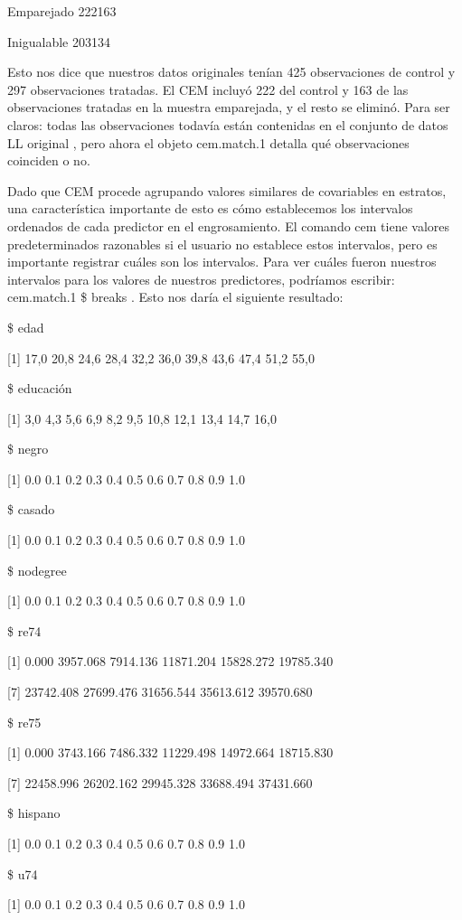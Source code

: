 \documentclass[
]{book}
\begin{document}
Emparejado 222163

Inigualable 203134

Esto nos dice que nuestros datos originales tenían 425 observaciones de control y 297 observaciones tratadas. El CEM incluyó 222 del control y 163 de las observaciones tratadas en la muestra emparejada, y el resto se eliminó. Para ser claros: todas las observaciones todavía están contenidas en el conjunto de datos LL original , pero ahora el objeto cem.match.1 detalla qué observaciones coinciden o no.

Dado que CEM procede agrupando valores similares de covariables en estratos, una característica importante de esto es cómo establecemos los intervalos ordenados de cada predictor en el engrosamiento. El comando cem tiene valores predeterminados razonables si el usuario no establece estos intervalos, pero es importante registrar cuáles son los intervalos. Para ver cuáles fueron nuestros intervalos para los valores de nuestros predictores, podríamos escribir: cem.match.1 \$ breaks . Esto nos daría el siguiente resultado:

\$ edad

{[}1{]} 17,0 20,8 24,6 28,4 32,2 36,0 39,8 43,6 47,4 51,2 55,0

\$ educación

{[}1{]} 3,0 4,3 5,6 6,9 8,2 9,5 10,8 12,1 13,4 14,7 16,0

\$ negro

{[}1{]} 0.0 0.1 0.2 0.3 0.4 0.5 0.6 0.7 0.8 0.9 1.0

\$ casado

{[}1{]} 0.0 0.1 0.2 0.3 0.4 0.5 0.6 0.7 0.8 0.9 1.0

\$ nodegree

{[}1{]} 0.0 0.1 0.2 0.3 0.4 0.5 0.6 0.7 0.8 0.9 1.0

\$ re74

{[}1{]} 0.000 3957.068 7914.136 11871.204 15828.272 19785.340

{[}7{]} 23742.408 27699.476 31656.544 35613.612 39570.680

\$ re75

{[}1{]} 0.000 3743.166 7486.332 11229.498 14972.664 18715.830

{[}7{]} 22458.996 26202.162 29945.328 33688.494 37431.660

\$ hispano

{[}1{]} 0.0 0.1 0.2 0.3 0.4 0.5 0.6 0.7 0.8 0.9 1.0

\$ u74

{[}1{]} 0.0 0.1 0.2 0.3 0.4 0.5 0.6 0.7 0.8 0.9 1.0
\end{document}
